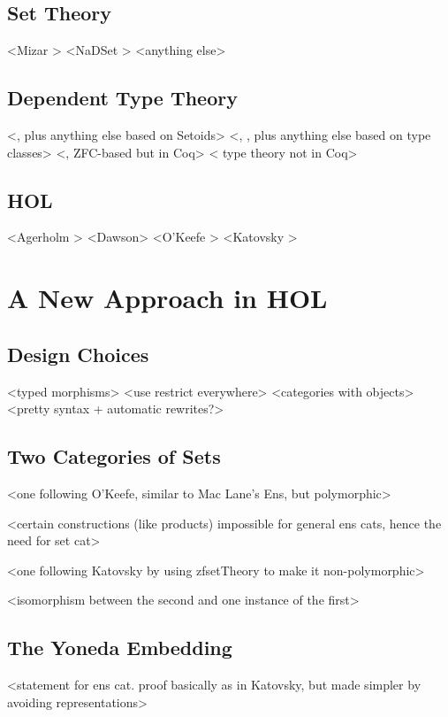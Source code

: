 \documentclass[twoside,titlepage,11pt]{article}
\begin{document}
\subsection{Set Theory}%
  <Mizar \cite{BylinksiCat1,TrybulecAltCat1}>%
  <NaDSet \cite{DBLP:journals/tcs/GilmoreT93}>%
  <anything else>%
\subsection{Dependent Type Theory}%
  <\cite{DBLP:conf/birthday/HuetS00}, plus anything else based on Setoids>%
  <\cite{Megacz}, \cite{Sozeau}, plus anything else based on type classes>%
  <\cite{Simpson04}, ZFC-based but in Coq>%
  <\cite{weber02program,Wilander,DBLP:conf/cade/KozenKR06} type theory not in Coq>%
\subsection{HOL}%
  <Agerholm \cite{Agerholm95}>%
  <Dawson>%
  <O'Keefe \cite{DBLP:journals/entcs/OKeefe04}>%
  <Katovsky \cite{Katovsky}>%
\section{A New Approach in HOL}%
\subsection{Design Choices}%
<typed morphisms>
<use restrict everywhere>
<categories with objects>
<pretty syntax + automatic rewrites?>
\subsection{Two Categories of Sets}%
<one following O'Keefe, similar to Mac Lane's Ens, but polymorphic>

<certain constructions (like products) impossible for general ens cats, hence the need for set cat>

<one following Katovsky by using zfsetTheory to make it non-polymorphic>

<isomorphism between the second and one instance of the first>
\subsection{The Yoneda Embedding}%
<statement for ens cat. proof basically as in Katovsky, but made simpler by avoiding representations>
\end{document}
